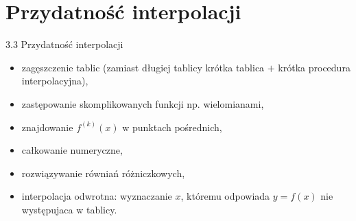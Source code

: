 \section{Przydatność interpolacji}
	\begin{frame}{3.3 Przydatność interpolacji}

\begin{itemize}

	\item zagęszczenie tablic (zamiast długiej tablicy krótka tablica $+$ krótka procedura interpolacyjna), \newline
    \item zastępowanie skomplikowanych funkcji np. wielomianami, \newline
    \item znajdowanie $f^{(k)}(x)$ w punktach pośrednich, \newline
    \item całkowanie numeryczne, \newline
    \item rozwiązywanie równiań różniczkowych, \newline
    \item interpolacja odwrotna: wyznaczanie $x$, któremu odpowiada $y = f(x)$ nie występujaca w tablicy.
     \end{itemize}

	\end{frame}

